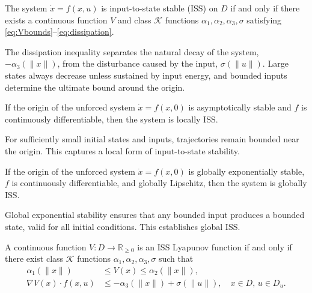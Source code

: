 \begin{theorem}
The system $\dot x=f(x,u)$ is input-to-state stable (ISS) on $D$ if and only if there 
exists a continuous function $V$ and class $\mathcal{K}$ functions 
$\alpha_1,\alpha_2,\alpha_3,\sigma$ satisfying \eqref{eq:Vbounds}--\eqref{eq:dissipation}.
\end{theorem}

\begin{remark}
The dissipation inequality separates the natural decay of the system, 
$-\alpha_3(\|x\|)$, from the disturbance caused by the input, $\sigma(\|u\|)$. 
Large states always decrease unless sustained by input energy, and bounded inputs 
determine the ultimate bound around the origin.
\end{remark}

\begin{theorem}
If the origin of the unforced system $\dot x=f(x,0)$ is asymptotically stable and 
$f$ is continuously differentiable, then the system is locally ISS.
\end{theorem}

\begin{remark}
For sufficiently small initial states and inputs, trajectories remain bounded near 
the origin. This captures a local form of input-to-state stability.
\end{remark}

\begin{theorem}
If the origin of the unforced system $\dot x=f(x,0)$ is globally exponentially stable, 
$f$ is continuously differentiable, and globally Lipschitz, then the system is globally ISS.
\end{theorem}

\begin{remark}
Global exponential stability ensures that any bounded input produces a bounded state, 
valid for all initial conditions. This establishes global ISS.
\end{remark}

\begin{theorem}
A continuous function $V:D\to\mathbb{R}_{\ge 0}$ is an ISS Lyapunov function if and 
only if there exist class $\mathcal{K}$ functions $\alpha_1,\alpha_2,\alpha_3,\sigma$ such that
\begin{align}
    \alpha_1(\|x\|) &\le V(x) \le \alpha_2(\|x\|), \\
    \nabla V(x) \cdot f(x,u) &\le -\alpha_3(\|x\|) + \sigma(\|u\|),
    \quad x\in D,\, u\in D_u.
\end{align}
\end{theorem}

